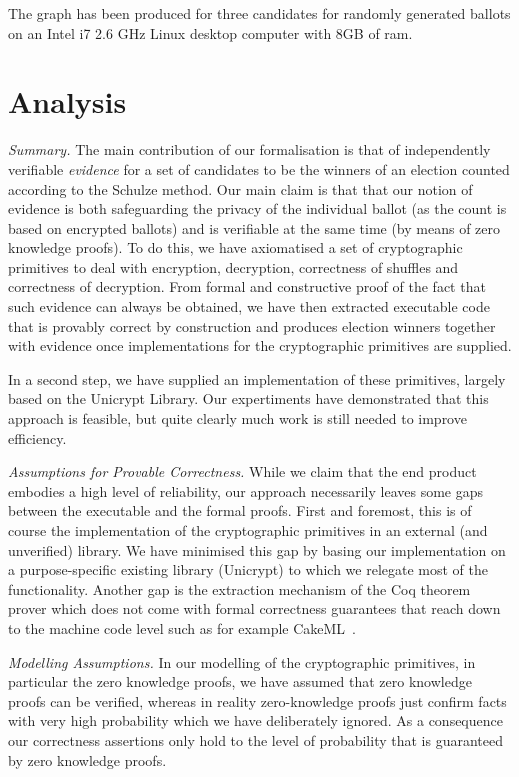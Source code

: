 \documentclass{llncs}
\begin{document}
The graph has been produced for three candidates for randomly generated ballots
on   an  Intel  i7  2.6  GHz  Linux  desktop  computer
with  8GB  of  ram.


\section{Analysis}

\noindent\emph{Summary.} The main contribution of our formalisation is that of independently
verifiable \emph{evidence} for a set of candidates to be the winners
of an election counted according to the Schulze method. Our main
claim is that that our notion of evidence is both safeguarding the
privacy of the individual ballot (as the count is based on encrypted
ballots) and is verifiable at the same time (by means of zero
knowledge proofs). To do this, we have axiomatised a set of
cryptographic primitives to deal with encryption, decryption,
correctness of shuffles and correctness of decryption. From formal
and constructive proof of the fact that such evidence can always be
obtained, we have then extracted executable code that is provably
correct by construction and produces election winners together with
evidence once implementations for the cryptographic primitives are
supplied.

In a second step, we have supplied an implementation of these
primitives, largely based on the Unicrypt Library. Our expertiments
have demonstrated that this approach is feasible, but quite clearly
much work is still needed to improve efficiency. 

\smallskip\noindent\emph{Assumptions for Provable Correctness.}
While we claim that the end product embodies a high level of
reliability, our approach necessarily leaves some gaps between the
executable and the formal proofs. First and foremost, this is of
course the implementation of the cryptographic primitives in an
external (and unverified) library. We have minimised this gap by
basing our implementation on a purpose-specific existing library
(Unicrypt) to which we relegate most of the functionality. Another
gap is the extraction mechanism of the Coq theorem prover which does
not come with formal correctness guarantees that reach down to the
machine code level such as for example CakeML~\cite{Kumar:2014:CVI}.

\smallskip\noindent\emph{Modelling Assumptions.} In our modelling of
the cryptographic primitives, in particular the zero knowledge
proofs, we have assumed that zero knowledge proofs can be verified,
whereas in reality zero-knowledge proofs just confirm facts with
very high probability which we have deliberately  ignored. As a
consequence our correctness assertions only hold to the level
of probability that is guaranteed by zero knowledge proofs.
\end{document}
